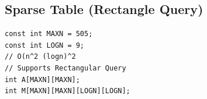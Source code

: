 \documentclass[a4paper,11pt,oneside]{article}
\begin{document}
\begin{multicols*}{\COLS}

\subsection{Sparse Table (Rectangle Query)}
\begin{lstlisting}
const int MAXN = 505;
const int LOGN = 9;
// O(n^2 (logn)^2
// Supports Rectangular Query
int A[MAXN][MAXN];
int M[MAXN][MAXN][LOGN][LOGN];


\end{lstlisting}
\end{multicols*}
\end{document}
